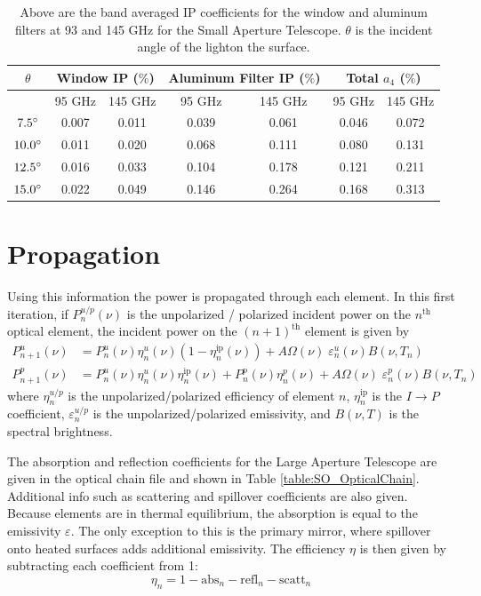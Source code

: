 \documentclass{article}
\theoremstyle{remark}
\newcommand{\tab}{\hspace*{2em}}
\renewcommand{\t}[1]{\text{#1}}
\newcommand{\ip}{$I\rightarrow P$ }
\begin{document}
\begin{table}[h]
\centering

\begin{tabular}{|c|c|c|c|c|c|c|}
\hline
$\theta $       & \multicolumn{2}{|c|}{Window IP ($\%$)} & \multicolumn{2}{|c|}{Aluminum Filter IP ($\%$)}  & \multicolumn{2}{|c|}{Total $a_4$ ($\%$)}           \\
\hline
 & 95 GHz & 145 GHz & 95 GHz & 145 GHz & 95 GHz & 145 GHz\\
 \hline
$7.5 \degree$ & 0.007 & 0.011  & 0.039  & 0.061 & 0.046 & 0.072 \\
$10.0 \degree$ & 0.011 & 0.020  & 0.068  & 0.111 & 0.080 & 0.131 \\
$12.5 \degree$ & 0.016 & 0.033  & 0.104  & 0.178 & 0.121 & 0.211 \\
$15.0 \degree$ & 0.022 & 0.049  & 0.146  & 0.264 & 0.168 & 0.313 \\
\hline
\end{tabular}
\caption{ Above are the band averaged IP coefficients for the window and aluminum filters at 93 and 145 GHz for the Small Aperture Telescope.
 $\theta$ is the incident angle of the lighton the surface.
}
\label{table:SAT_ip}
\end{table}

\section{Propagation}

\tab Using this information the power is propagated through each element.
In this first iteration, if $P_{n}^{u/p}(\nu)$ is the unpolarized / polarized incident power on the $n^\t{th}$ optical element, 
the incident power on the $(n+1)^\t{th}$ element is given by
\begin{align}
P_{n+1}^u(\nu) &= P_n^u(\nu) \eta_n^u(\nu) (1 - \eta_n^{\t{ip}}(\nu)) + A\Omega(\nu) \; \varepsilon_n^u(\nu) B(\nu,T_n)\\
P_{n+1}^p(\nu) &= P_n^u(\nu) \eta_n^u(\nu) \eta_n^{\t{ip}}(\nu) +  P_n^p(\nu) \eta_n^p(\nu) + A\Omega(\nu) \; \varepsilon_n^p(\nu) B(\nu,T_n)
\end{align}
where $\eta_n^{u/p}$ is the unpolarized/polarized efficiency of element $n$, $\eta_n^\t{ip}$ is the \ip coefficient, $\varepsilon_n^{u/p}$
is the unpolarized/polarized emissivity, and $B(\nu,T)$ is the spectral brightness.

\tab The absorption and reflection coefficients for the Large Aperture Telescope are given in the optical chain file and shown in Table 
\ref{table:SO_OpticalChain}. Additional info such as scattering and spillover coefficients are also given.
Because elements are in thermal equilibrium, the absorption is equal to the emissivity $\varepsilon$.
The only exception to this is the primary mirror, where spillover onto heated surfaces adds additional emissivity.
The efficiency $\eta$ is then given by subtracting each coefficient from 1:
\[\eta_n = 1 - \t{abs}_n - \t{refl}_n - \t{scatt}_n\]
\end{document}
